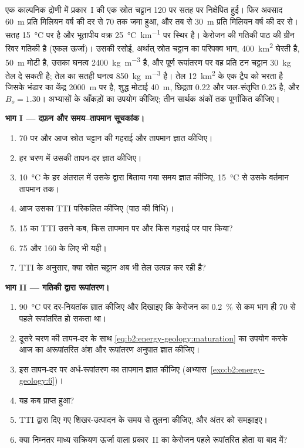 \begin{problem}\label{pb:b2:energy-geology:1}
एक काल्पनिक द्रोणी में प्रकार~I की एक स्रोत चट्टान \qty{120}{\Ma} पर सतह पर निक्षेपित हुई।
फिर अवसाद \qty{60}{m} प्रति मिलियन वर्ष की दर से \qty{70}{\Ma} तक जमा हुआ, और तब से \qty{30}{m}
प्रति मिलियन वर्ष की दर से। सतह \qty{15}{\celsius} पर है और भूतापीय वक्र
\qty{25}{\celsius\per\km} पर स्थिर है। केरोजन की गतिकी पाठ की ग्रीन रिवर गतिकी है (एकल ऊर्जा)।
उसकी रसोई, अर्थात् स्रोत चट्टान का परिपक्व भाग, \qty{400}{km^2} घेरती है, \qty{50}{m} मोटी है,
उसका घनत्व \qty{2400}{kg.m^{-3}} है, और पूर्ण रूपांतरण पर वह प्रति टन चट्टान \qty{30}{kg} तेल दे
सकती है; तेल का सतही घनत्व \qty{850}{kg.m^{-3}} है। तेल \qty{12}{km^2} के एक ट्रैप को भरता है जिसके
भंडार का केंद्र \qty{2000}{m} पर है, शुद्ध मोटाई \qty{40}{m},
छिद्रता 0.22 और जल-संतृप्ति 0.25 है, और $B_o = 1.30$। अभ्यासों के आँकड़ों का उपयोग कीजिए; तीन सार्थक
अंकों तक पूर्णांकित कीजिए।

\noindent\textbf{भाग I --- दफ़न और समय--तापमान सूचकांक।}
\begin{enumerate}
  \item \qty{70}{\Ma} पर और आज स्रोत चट्टान की गहराई और तापमान ज्ञात कीजिए।
  \item हर चरण में उसकी तापन-दर ज्ञात कीजिए।
  \item \qty{10}{\celsius} के हर अंतराल में उसके द्वारा बिताया गया समय ज्ञात कीजिए, \qty{15}{\celsius} से
        उसके वर्तमान तापमान तक।
  \item आज उसका TTI परिकलित कीजिए (पाठ की विधि)।
  \item 15 का TTI उसने कब, किस तापमान पर और किस गहराई पर पार किया?
  \item 75 और 160 के लिए भी यही।
  \item TTI के अनुसार, क्या स्रोत चट्टान अब भी तेल उत्पन्न कर रही है?
\end{enumerate}

\noindent\textbf{भाग II --- गतिकी द्वारा रूपांतरण।}
\begin{enumerate}[resume]
  \item \qty{90}{\celsius} पर दर-नियतांक ज्ञात कीजिए और दिखाइए कि केरोजन का
        \qty{0.2}{\percent} से कम भाग ही \qty{70}{\Ma} से पहले रूपांतरित हो सकता था।
  \item दूसरे चरण की तापन-दर के साथ \eqref{eq:b2:energy-geology:maturation} का उपयोग करके
        आज का अरूपांतरित अंश और रूपांतरण अनुपात ज्ञात कीजिए।
  \item इस तापन-दर पर अर्ध-रूपांतरण का तापमान ज्ञात कीजिए (अभ्यास~\ref{exo:b2:energy-geology:6})।
  \item यह कब प्राप्त हुआ?
  \item TTI द्वारा दिए गए शिखर-उत्पादन के समय से तुलना कीजिए, और अंतर को समझाइए।
  \item क्या निम्नतर माध्य सक्रियण ऊर्जा वाला प्रकार~II का केरोजन पहले रूपांतरित होता या बाद में?
\end{enumerate}


\end{problem}

